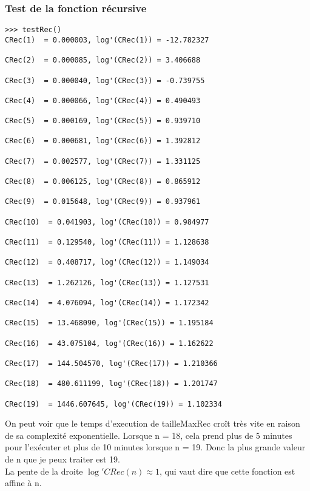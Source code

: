 \documentclass[french]{article}
\begin{document}
\subsubsection{Test de la fonction récursive}
\begin{lstlisting}
>>> testRec()
CRec(1)  = 0.000003, log'(CRec(1)) = -12.782327

CRec(2)  = 0.000085, log'(CRec(2)) = 3.406688

CRec(3)  = 0.000040, log'(CRec(3)) = -0.739755

CRec(4)  = 0.000066, log'(CRec(4)) = 0.490493

CRec(5)  = 0.000169, log'(CRec(5)) = 0.939710

CRec(6)  = 0.000681, log'(CRec(6)) = 1.392812

CRec(7)  = 0.002577, log'(CRec(7)) = 1.331125

CRec(8)  = 0.006125, log'(CRec(8)) = 0.865912

CRec(9)  = 0.015648, log'(CRec(9)) = 0.937961

CRec(10)  = 0.041903, log'(CRec(10)) = 0.984977

CRec(11)  = 0.129540, log'(CRec(11)) = 1.128638

CRec(12)  = 0.408717, log'(CRec(12)) = 1.149034

CRec(13)  = 1.262126, log'(CRec(13)) = 1.127531

CRec(14)  = 4.076094, log'(CRec(14)) = 1.172342

CRec(15)  = 13.468090, log'(CRec(15)) = 1.195184

CRec(16)  = 43.075104, log'(CRec(16)) = 1.162622

CRec(17)  = 144.504570, log'(CRec(17)) = 1.210366

CRec(18)  = 480.611199, log'(CRec(18)) = 1.201747

CRec(19)  = 1446.607645, log'(CRec(19)) = 1.102334

\end{lstlisting}
On peut voir que le temps d'execution de tailleMaxRec croît très vite en raison de sa complexité exponentielle. Lorsque n = 18, cela prend plus de 5 minutes pour l'exécuter et plus de 10 minutes lorsque n = 19. Donc la plus grande valeur de n que je peux traiter est 19.\\
La pente de la droite $\log' CRec(n) \approx 1$, qui vaut dire que cette fonction est affine à n.
\end{document}

